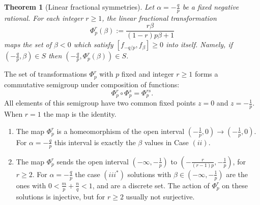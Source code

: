 \documentclass[11pt, letterpaper, reqno]{amsart}
\newtheorem{thm}{Theorem}[section]
\theoremstyle{definition}
\theoremstyle{remark}
\numberwithin{equation}{section}
\begin{document}
\begin{thm}[Linear fractional symmetries]
\label{thm:lin-frac-sym}
Let  $\alpha = -\frac{q}{p}$ be a fixed negative rational. 
For each integer $r \ge 1$, 
the  linear fractional transformation
\begin{equation*}
\Phi_{p}^r(\beta) := \frac{r \beta}{ (1-r)p \beta +1}  
\end{equation*}
maps the  set of  $\beta<0$ which satisfy 
$[f_{-q/p}, f_{\beta}] \geq 0$
into itself. 
Namely,
if $(-\frac{q}{p}, \beta) \in S$
then $(-\frac{q}{p}, \Phi_p^r(\beta)) \in S$.
\end{thm}


The set of  transformations $\Phi_{p}^r$ 
with $p$ fixed and integer  $r\geq 1$ forms a commutative semigroup
under composition of functions:
\begin{equation*} 
\Phi_{p}^{r} \circ \Phi_{p}^{s} = \Phi_{p}^{rs} .
\end{equation*}
All elements of this semigroup have two common  fixed points  $z=0$ and $z= -\frac{1}{p}$. 
When  $r= 1$ the  map  is the identity.
\begin{enumerate}
\item
The map $\Phi_{p}^r$ is a  homeomorphism of the open interval $( -\frac{1}{p},0) \to ( -\frac{1}{p},0)$.
For $\alpha= -\frac{q}{p}$ this  interval   
is exactly  the $\beta$ values in Case $(ii)$.
\item 
The map $\Phi_{p}^r$ 
sends the open interval  $(-\infty, -\frac{1}{p})$ %
to 
$(-\frac{r}{(r-1)p}, -\frac{1}{p})$, for $r\geq 2$.
For  $\alpha= -\frac{q}{p}$ the  case $(iii^{\ast})$ solutions with $\beta\in (-\infty, -\frac{1}{p} )$
are the ones with  $0 < \frac{m}{p} + \frac{n}{q} <1$, and are a discrete set. 
The action of $\Phi_{p}^r$ on these solutions is injective, but for $r\ge 2$ usually not surjective. 
\end{enumerate}
\end{document}

